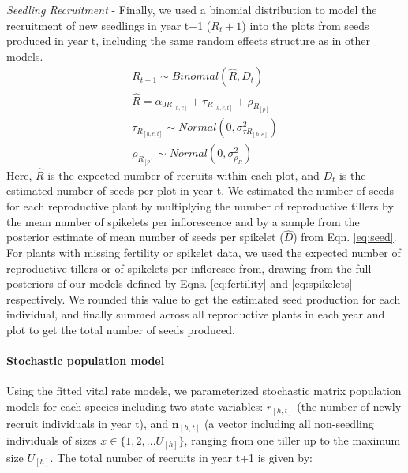\documentclass[12pt]{article}
\begin{document}
\emph{Seedling Recruitment} - Finally, we used a binomial distribution to model the recruitment of new seedlings in year t+1 ($R_t+1$) into the plots from seeds produced in year t, including the same random effects structure as in other models.
\begin{subequations} 
	\label{eq:recruitment}
	\begin{align}
		R_{t+1} \sim Binomial(\hat{R}, D_t) \\
		\hat{R} =  \alpha_{0R_{[h,e]}} + \tau_{R_{[h,e,t]}} + \rho_{R_{[p]}} \\
		\tau_{R_{[h,e,t]}} \sim Normal(0, \sigma^2_{\tau R_{[h,e]}})\\
		\rho_{R_{[p]}} \sim Normal(0, \sigma^2_{\rho_{R}})
	\end{align}
\end{subequations}
Here, $\hat{R}$ is the expected number of recruits within each plot, and $D_t$ is the estimated number of seeds per plot in year t. 
We estimated the number of seeds for each reproductive plant by multiplying the number of reproductive tillers by the mean number of spikelets per inflorescence and by a sample from the posterior estimate of mean number of seeds per spikelet ($\hat{D}$) from Eqn. \ref{eq:seed}.
For plants with missing fertility or spikelet data, we used the expected number of reproductive tillers or of spikelets per infloresce from, drawing from the full posteriors of our models defined by Eqns. \ref{eq:fertility} and \ref{eq:spikelets} respectively. 
We rounded this value to get the estimated seed production for each individual, and finally summed across all reproductive plants in each year and plot to get the total number of seeds produced. 

\paragraph*{Stochastic population model}
Using the fitted vital rate models, we parameterized stochastic matrix population models for each species including two state variables: $r_{[h,t]}$ (the number of newly recruit individuals in year t), and $\textbf{n}_{[h,t]}$ (a vector including all non-seedling individuals of sizes $x\in\{1,2,...U_{[h]}\} $, ranging from one tiller up to the maximum size $U_{[h]}$. 
The total number of recruits in year t+1 is given by:
\end{document}
